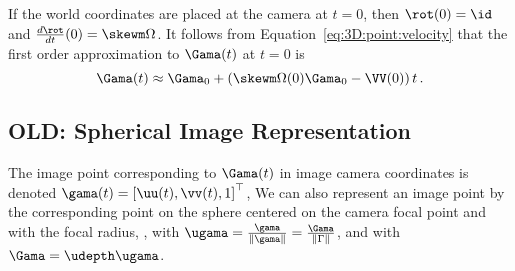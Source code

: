 \noindent If the world coordinates are placed at the camera at $t=0$, then
$\rot(0) = \id$ and $\frac{d \rot}{dt} (0) = \skewm\Omega$.
It follows from Equation~\eqref{eq:3D:point:velocity} that the first order
approximation to $\Gama(t)$ at $t=0$ is
\begin{equation}
\Gama(t) \approx \Gama_0 + \left( \skewm\Omega(0)\Gama_0 - \VV(0) \right)t\,.
\end{equation}

\subsection{OLD: Spherical Image Representation} The image point corresponding to $\Gama(t)$ in
image camera coordinates is denoted $\gama(t) =
\left[ \uu(t), \vv(t), 1 \right]^\top$, %
%
%
We can also represent an image point by the
corresponding point on the sphere centered on the camera focal point and with
the focal radius, \ie, with $\ugama = \frac{\gama}{\|\gama\|} =
\frac{\Gama}{\|\Gamma\|}$, and with
$\Gama = \udepth\ugama$. 

